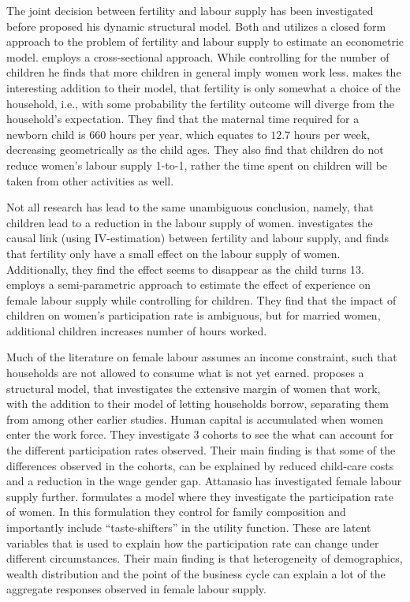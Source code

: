 The joint decision between fertility and labour supply has been investigated before \textcite{francesconi_joint_2002} proposed his dynamic structural model. Both \textcite{moffitt_estimation_1984} and \textcite{hotz_empirical_1988} utilizes a closed form approach to the problem of fertility and labour supply to estimate an econometric model. \textcite{moffitt_estimation_1984} employs a cross-sectional approach. While controlling for the number of children he finds that more children in general imply women work less. \textcite{hotz_empirical_1988} makes the interesting addition to their model, that fertility is only somewhat a choice of the household, i.e., with some probability the fertility outcome will diverge from the household's expectation. They find that the maternal time required for a newborn child is 660 hours per year, which equates to $12.7$ hours per week, decreasing geometrically as the child ages. They also find that children do not reduce women's labour supply 1-to-1, rather the time spent on children will be taken from other activities as well.

Not all research has lead to the same unambiguous conclusion, namely, that children lead to a reduction in the labour supply of women.   \textcite{angrist_children_1996}  investigates the causal link (using IV-estimation) between fertility and labour supply, and finds that fertility only have a small effect on the labour supply of women. Additionally, they find the effect seems to disappear as the child turns 13.  \textcite{altug_effect_1998} employs a semi-parametric approach to estimate the effect of experience on female labour supply while controlling for children. They find that the impact of children on women's participation rate is ambiguous, but for married women, additional children increases number of hours worked.

Much of the literature on female labour assumes an income constraint, such that households are not allowed to consume what is not yet earned.  \textcite{attanasio_explaining_2008} proposes a structural model, that investigates the extensive margin of women that work, with the addition to their model  of letting households borrow, separating them from \textcite{francesconi_joint_2002} among other earlier studies. Human capital is accumulated when women enter the work force. They investigate 3 cohorts to see the what can account for the different participation rates observed. Their main finding is that some of the differences observed in the cohorts, can be explained by reduced child-care costs and a reduction in the wage gender gap. Attanasio has investigated female labour supply further.  \textcite{attanasio_aggregating_2018} formulates a model where they investigate the participation rate of women. In this formulation they control for family composition and importantly include ``taste-shifters'' in the utility function. These are latent variables that is used to explain how the participation rate can change under different circumstances. Their main finding is that heterogeneity of demographics, wealth distribution and the point of the business cycle can explain a lot of the aggregate responses observed in female labour supply.

